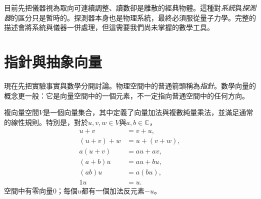 目前先把儀器視為取向可連續調整、讀數卻是離散的經典物體。這種對\emph{系統}與\emph{探測器}的區分只是暫時的。探測器本身也是物理系統，最終必須服從量子力學。完整的描述會將系統與儀器一併處理，但這需要我們尚未掌握的數學工具。

\begin{classroomqa}
\end{classroomqa}

\begin{classroomqa}
\end{classroomqa}

\begin{classroomqa}
\end{classroomqa}

\section{指針與抽象向量}

現在先把實驗事實與數學分開討論。物理空間中的普通箭頭稱為\emph{指針}。數學向量的概念更一般：它是向量空間中的一個元素，不一定指向普通空間中的任何方向。

\begin{definition}
複向量空間\(V\)是一個向量集合，其中定義了向量加法與複數純量乘法，並滿足通常的線性規則。特別是，對於\(u,v,w\in V\)與\(a,b\in\mathbb C\)，
\begin{align}
  u+v&=v+u,\\
  (u+v)+w&=u+(v+w),\\
  a(u+v)&=au+av,\\
  (a+b)u&=au+bu,\\
  (ab)u&=a(bu),\\
  1u&=u.
\end{align}
空間中有零向量\(0\)；每個\(u\)都有一個加法反元素\(-u\)。
\end{definition}

